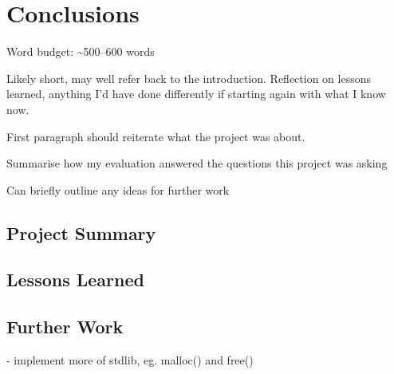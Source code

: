 \documentclass[00-main.tex]{subfiles}
\begin{document}
\chapter{Conclusions}

\begin{mrwComment}
Word budget: \textasciitilde 500--600 words
\end{mrwComment}

\begin{mrwComment}
Likely short, may well refer back to the introduction. Reflection on lessons learned, anything I'd have done differently if starting again with what I know now.

First paragraph should reiterate what the project was about.

Summarise how my evaluation answered the questions this project was asking

Can briefly outline any ideas for further work
\end{mrwComment}

\section{Project Summary}

\section{Lessons Learned}

\section{Further Work}

\begin{mrwComment}
- implement more of stdlib, eg. malloc() and free()
\end{mrwComment}
\end{document}
